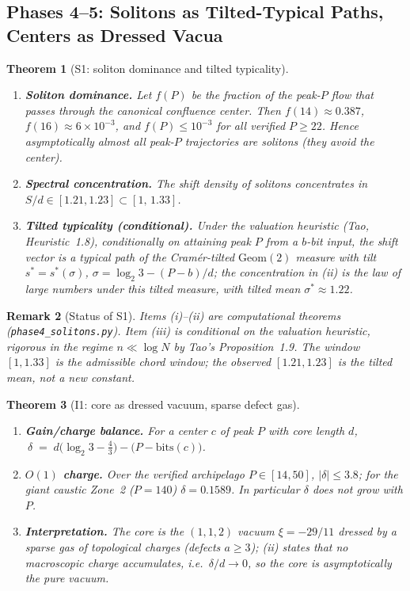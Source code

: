 \documentclass[12pt,a4paper]{article}
\newtheorem{theorem}{Theorem}[section]
\newtheorem{remark}[theorem]{Remark}
\begin{document}
\subsection{Phases 4--5: Solitons as Tilted-Typical Paths, Centers as Dressed Vacua}

\begin{theorem}[S1: soliton dominance and tilted typicality]
\label{thm:S1}
\begin{enumerate}
\item[(i)] \textbf{Soliton dominance.} Let $f(P)$ be the fraction of the peak-$P$
flow that passes through the canonical confluence center. Then
$f(14)\approx0.387$, $f(16)\approx6\times10^{-3}$, and $f(P)\le10^{-3}$ for all
verified $P\ge22$. Hence asymptotically almost all peak-$P$ trajectories are
solitons (they avoid the center).
\item[(ii)] \textbf{Spectral concentration.} The shift density of solitons concentrates
in $S/d\in[1.21,1.23]\subset[1,\,1.33]$.
\item[(iii)] \textbf{Tilted typicality (conditional).} Under the valuation heuristic
(Tao, Heuristic~1.8), conditionally on attaining peak $P$ from a $b$-bit input, the
shift vector is a typical path of the Cram\'er-tilted $\mathrm{Geom}(2)$ measure with
tilt $s^*=s^*(\sigma)$, $\sigma=\log_2 3-(P-b)/d$; the concentration in (ii) is the
law of large numbers under this tilted measure, with tilted mean $\sigma^*\approx1.22$.
\end{enumerate}
\end{theorem}

\begin{remark}[Status of S1]
Items (i)--(ii) are computational theorems (\texttt{phase4\_solitons.py}). Item (iii)
is conditional on the valuation heuristic, rigorous in the regime $n\ll\log N$ by
Tao's Proposition~1.9. The window $[1,1.33]$ is the admissible chord window; the
observed $[1.21,1.23]$ is the tilted mean, not a new constant.
\end{remark}

\begin{theorem}[I1: core as dressed vacuum, sparse defect gas]
\label{thm:I1}
\begin{enumerate}
\item[(i)] \textbf{Gain/charge balance.} For a center $c$ of peak $P$ with core length
$d$, $\ \delta \;=\; d\big(\log_2 3-\tfrac43\big)-\big(P-\mathrm{bits}(c)\big)$.
\item[(ii)] \textbf{$O(1)$ charge.} Over the verified archipelago $P\in[14,50]$,
$|\delta|\le3.8$; for the giant caustic Zone~2 ($P=140$) $\delta=0.1589$.
In particular $\delta$ does not grow with $P$.
\item[(iii)] \textbf{Interpretation.} The core is the $(1,1,2)$ vacuum
$\xi=-29/11$ dressed by a sparse gas of topological charges (defects $a\ge3$);
(ii) states that no macroscopic charge accumulates, i.e.\ $\delta/d\to0$, so the
core is asymptotically the pure vacuum.
\end{enumerate}
\end{theorem}
\end{document}
